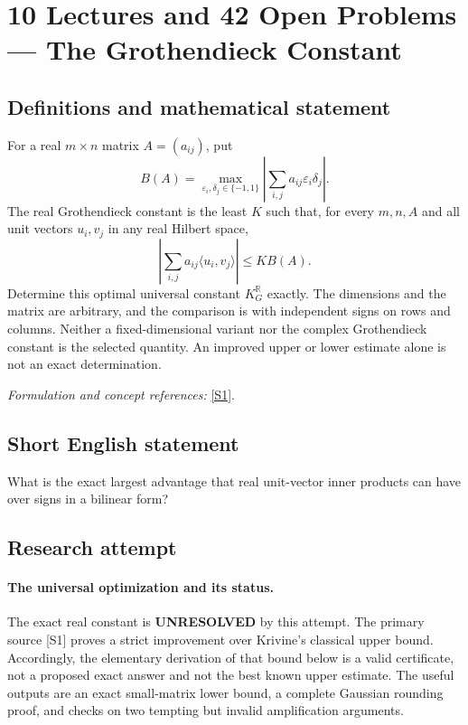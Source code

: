 \documentclass[11pt]{article}
\begin{document}
\section*{\texorpdfstring{10 Lectures and 42 Open Problems — The Grothendieck Constant}{10 Lectures and 42 Open Problems — The Grothendieck Constant}}\label{2800803}
\subsection{Definitions and mathematical statement}
For a real $m\times n$ matrix $A=(a_{ij})$, put
\[
 B(A)=\max_{{\varepsilon}_i,\delta_j\in\{-1,1\}}
 \left|\sum_{i,j}a_{ij}{\varepsilon}_i\delta_j\right|.
\]
The real Grothendieck constant is the least $K$ such that, for every $m,n,A$ and all unit vectors $u_i,v_j$ in any real Hilbert space,
\[
 \left|\sum_{i,j}a_{ij}\langle u_i,v_j\rangle\right|\le K B(A).
\]
Determine this optimal universal constant $K_G^{{\mathbb{R}}}$ exactly. The dimensions and the matrix are arbitrary, and the comparison is with independent signs on rows and columns. Neither a fixed-dimensional variant nor the complex Grothendieck constant is the selected quantity. An improved upper or lower estimate alone is not an exact determination.
\par\smallskip\textit{Formulation and concept references:} \href{https://arxiv.org/abs/1103.6161}{[S1]}.

\subsection{Short English statement}
What is the exact largest advantage that real unit-vector inner products can have over signs in a bilinear form?
\subsection{Research attempt}
\paragraph{The universal optimization and its status.}
The exact real constant is \textbf{UNRESOLVED} by this attempt.
The primary source [S1] proves a strict improvement over Krivine's
classical upper bound. Accordingly, the elementary derivation of
that bound below is a valid certificate, not a proposed exact answer
and not the best known upper estimate. The useful outputs are an
exact small-matrix lower bound, a complete Gaussian rounding proof,
and checks on two tempting but invalid amplification arguments.
\end{document}
